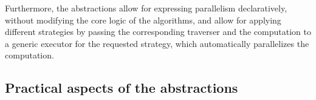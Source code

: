 Furthermore, the abstractions allow for expressing parallelism declaratively, without modifying the core logic of the algorithms, and allow for applying different strategies by passing the corresponding traverser and the computation to a generic executor for the requested strategy, which automatically parallelizes the computation.







\subsection{Practical aspects of the abstractions}\label{sec:cpp-abstractions}

